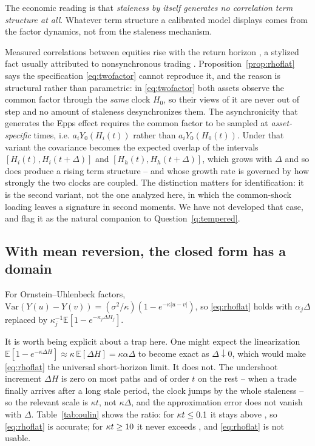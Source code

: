 \documentclass{ws-ijtaf}
\newcommand{\E}{\mathbb{E}}
\begin{document}
The economic reading is that \emph{staleness by itself generates no correlation
term structure at all}. Whatever term structure a calibrated model displays
comes from the factor dynamics, not from the staleness mechanism.

\begin{remark}
\label{rem:epps}
Measured correlations between equities rise with the return horizon
\citep{epp79}, a stylized fact usually attributed to nonsynchronous trading
\citep{lo90}. Proposition~\ref{prop:rhoflat} says the specification
\eqref{eq:twofactor} cannot reproduce it, and the reason is structural rather
than parametric: in \eqref{eq:twofactor} both assets observe the common factor
through the \emph{same} clock $H_0$, so their views of it are never out of step
and no amount of staleness desynchronizes them. The asynchronicity that
generates the Epps effect requires the common factor to be sampled at
\emph{asset-specific} times, i.e. $a_i Y_0(H_i(t))$ rather than
$a_i Y_0(H_0(t))$. Under that variant the covariance becomes the expected
overlap of the intervals $[H_i(t),H_i(t+\Delta)]$ and $[H_h(t),H_h(t+\Delta)]$,
which grows with $\Delta$ and so does produce a rising term structure --
and whose growth rate is governed by how strongly the two clocks are coupled.
The distinction matters for identification: it is the second variant, not the
one analyzed here, in which the common-shock loading leaves a signature in
second moments. We have not developed that case, and flag it as the natural
companion to Question~\ref{q:tempered}.
\end{remark}

\begin{table}[t]
{}
\label{tab:rho}
\end{table}

\subsection{With mean reversion, the closed form has a domain}

For Ornstein--Uhlenbeck factors, $\mathrm{Var}(Y(u)-Y(v)) =
(\sigma^2/\kappa)(1-e^{-\kappa|u-v|})$, so \eqref{eq:rhoflat} holds with
$\alpha_j\Delta$ replaced by $\kappa_j^{-1}\E[1-e^{-\kappa_j\Delta H_j}]$.

It is worth being explicit about a trap here. One might expect the linearization
$\E[1-e^{-\kappa\Delta H}] \approx \kappa\,\E[\Delta H]=\kappa\alpha\Delta$ to
become exact as $\Delta\downarrow0$, which would make \eqref{eq:rhoflat} the
universal short-horizon limit. It does not. The undershoot increment
$\Delta H$ is zero on most paths and of order $t$ on the rest -- when a trade
finally arrives after a long stale period, the clock jumps by the whole
staleness -- so the relevant scale is $\kappa t$, not $\kappa\Delta$, and the
approximation error does not vanish with $\Delta$. Table~\ref{tab:oulin} shows
the ratio: for $\kappa t \le 0.1$ it stays above \rhoLinSmallKt{}, so
\eqref{eq:rhoflat} is accurate; for $\kappa t \ge 10$ it never exceeds
\rhoLinLargeKt{}, and \eqref{eq:rhoflat} is not usable.
\end{document}
